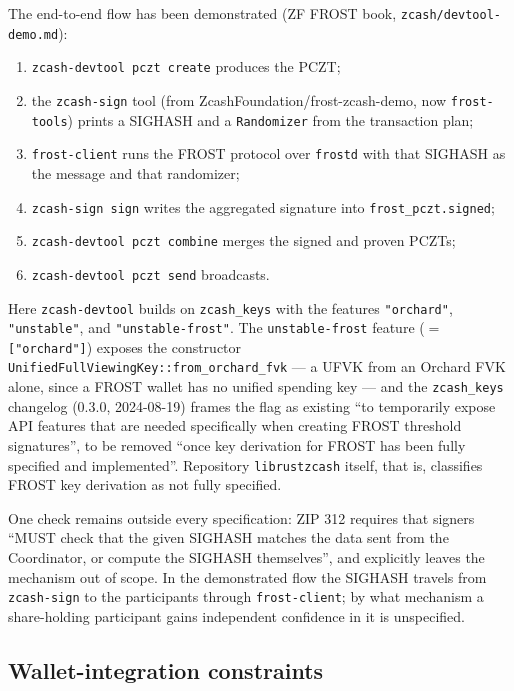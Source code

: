 \documentclass[11pt,a4paper]{article}
\theoremstyle{definition}
\begin{document}
The end-to-end flow has been demonstrated (ZF FROST book,
\texttt{zcash/devtool-demo.md}):
\begin{enumerate}
\item \texttt{zcash-devtool pczt create} produces the PCZT;
\item the \texttt{zcash-sign} tool (from
  ZcashFoundation/\allowbreak frost-zcash-demo, now \texttt{frost-tools})
  prints a SIGHASH and a \texttt{Randomizer} from the transaction plan;
\item \texttt{frost-client} runs the FROST protocol over \texttt{frostd}
  with that SIGHASH as the message and that randomizer;
\item \texttt{zcash-sign sign} writes the aggregated signature into
  \texttt{frost\_pczt.signed};
\item \texttt{zcash-devtool pczt combine} merges the signed and proven
  PCZTs;
\item \texttt{zcash-devtool pczt send} broadcasts.
\end{enumerate}
Here \texttt{zcash-devtool} builds on \texttt{zcash\_keys} with the
features \texttt{"orchard"}, \texttt{"unstable"}, and
\texttt{"unstable-frost"}. The \texttt{unstable-frost} feature ($=$
\texttt{["orchard"]}) exposes the constructor
\texttt{UnifiedFullViewingKey::}\allowbreak\texttt{from\_orchard\_fvk}
--- a UFVK from an Orchard FVK alone, since a FROST wallet has no
unified spending key --- and the \texttt{zcash\_keys} changelog (0.3.0,
2024-08-19) frames the flag as existing ``to temporarily expose API
features that are needed
specifically when creating FROST threshold signatures'', to be removed
``once key derivation for FROST has been fully specified and
implemented''. Repository \texttt{librustzcash} itself, that is,
classifies FROST key derivation as not fully specified.

One check remains outside every specification: ZIP 312 requires that
signers ``MUST check that the given SIGHASH matches the data sent from the
Coordinator, or compute the SIGHASH themselves'', and explicitly leaves
the mechanism out of scope. In the demonstrated flow the SIGHASH travels
from \texttt{zcash-sign} to the participants through
\texttt{frost-client}; by what mechanism a share-holding participant
gains independent confidence in it is unspecified.

\subsection{Wallet-integration constraints}\label{sec:fr-deploy-wallet}
\end{document}
